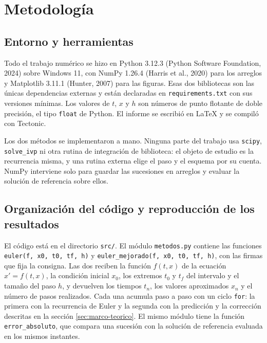 \section{Metodología}
\label{sec:metodologia}

\subsection{Entorno y herramientas}
\label{subsec:entorno}

Todo el trabajo numérico se hizo en Python 3.12.3 (Python Software Foundation, 2024) sobre
Windows 11, con NumPy 1.26.4 (Harris et al., 2020) para los arreglos y Matplotlib 3.11.1
(Hunter, 2007) para las figuras. Esas dos bibliotecas son las únicas dependencias externas y
están declaradas en \texttt{requirements.txt} con sus versiones mínimas. Los valores de $t$, $x$
y $h$ son números de punto flotante de doble precisión, el tipo \texttt{float} de Python. El
informe se escribió en \LaTeX{} y se compiló con Tectonic.

Los dos métodos se implementaron a mano. Ninguna parte del trabajo usa \texttt{scipy},
\texttt{solve\_ivp} ni otra rutina de integración de biblioteca: el objeto de estudio es la
recurrencia misma, y una rutina externa elige el paso y el esquema por su cuenta. NumPy
interviene solo para guardar las sucesiones en arreglos y evaluar la solución de referencia
sobre ellos.

\subsection{Organización del código y reproducción de los resultados}
\label{subsec:codigo}

El código está en el directorio \texttt{src/}. El módulo \texttt{metodos.py} contiene las
funciones \texttt{euler(f, x0, t0, tf, h)} y \texttt{euler\_mejorado(f, x0, t0, tf, h)}, con las
firmas que fija la consigna. Las dos reciben la función $f(t, x)$ de la ecuación $x' = f(t, x)$,
la condición inicial $x_0$, los extremos $t_0$ y $t_f$ del intervalo y el tamaño del paso $h$, y
devuelven los tiempos $t_n$, los valores aproximados $x_n$ y el número de pasos realizados. Cada
una acumula paso a paso con un ciclo \texttt{for}: la primera con la recurrencia de Euler y la
segunda con la predicción y la corrección descritas en la sección \ref{sec:marco-teorico}. El
mismo módulo tiene la función \texttt{error\_absoluto}, que compara una sucesión con la solución
de referencia evaluada en los mismos instantes.

